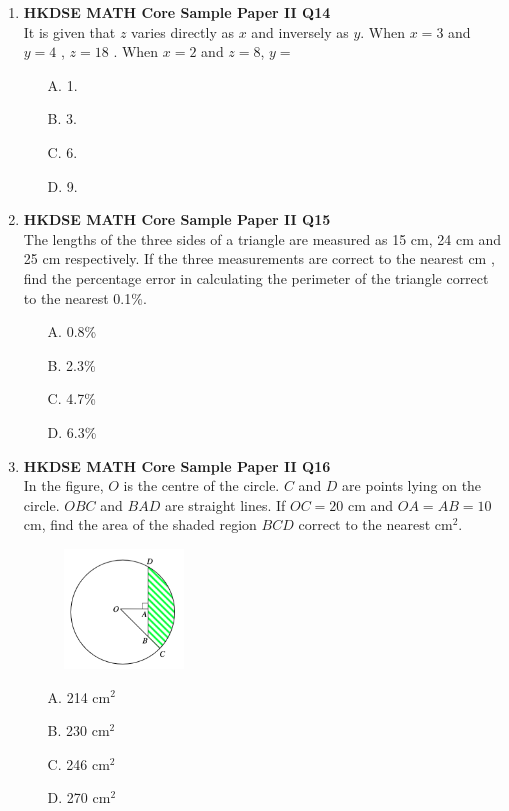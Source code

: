 \documentclass[12pt]{article}
\begin{document}
\begin{enumerate}
	\item \textbf{HKDSE MATH Core Sample Paper II Q14}\\
	It is given that $z$ varies directly as $x$ and inversely as $y$. When $x = 3$ and $y = 4$ , $z = 18$ . When $x = 2$ and $z = 8$, $y = $
	\begin{enumerate}
		\item[A.] 1.
		\item[B.] 3.
		\item[C.] 6.
		\item[D.] 9.
	\end{enumerate}

	\item \textbf{HKDSE MATH Core Sample Paper II Q15}\\
	The lengths of the three sides of a triangle are measured as 15 cm, 24 cm and 25 cm respectively. If the three measurements are correct to the nearest cm , find the percentage error in calculating the perimeter of the triangle correct to the nearest 0.1\%.
	\begin{enumerate}
		\item[A.] 0.8\%
		\item[B.] 2.3\%
		\item[C.] 4.7\%
		\item[D.] 6.3\%
	\end{enumerate}

	\item \textbf{HKDSE MATH Core Sample Paper II Q16}\\
	In the figure, $O$ is the centre of the circle. $C$ and $D$ are points lying on the circle. $OBC$ and $BAD$ are straight lines. If $OC = 20$ cm and $OA = AB = 10$ cm, find the area of the shaded region $BCD$ correct to the nearest cm$^2$.
	\begin{figure}[h]
		\centering
		\includegraphics[width = 0.3\textwidth]{SPFigure2.16.png}	
	\end{figure}
	\begin{enumerate}
		\item[A.] 214 cm$^2$
		\item[B.] 230 cm$^2$
		\item[C.] 246 cm$^2$
		\item[D.] 270 cm$^2$
	\end{enumerate}


\end{enumerate}
\end{document}
